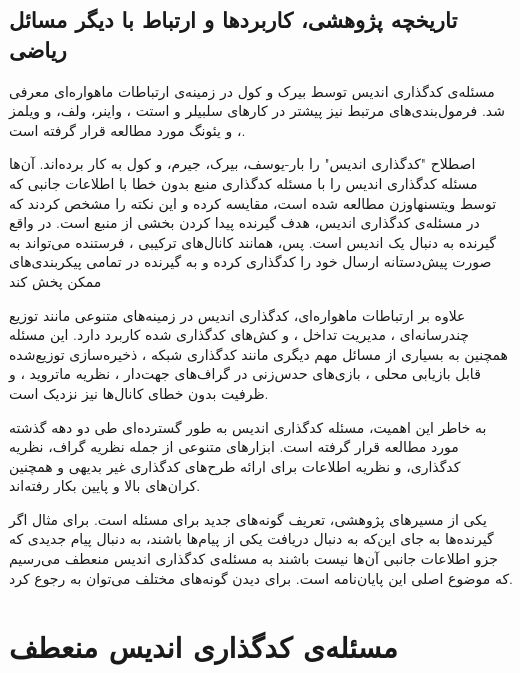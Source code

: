\subsection{تاریخچه پژوهشی، کاربردها و ارتباط با دیگر مسائل ریاضی}

مسئله‌ی کدگذاری اندیس توسط بیرک و کول 
\cite{25, 26}
 در زمینه‌ی ارتباطات ماهواره‌ای معرفی شد. فرمول‌بندی‌های مرتبط نیز پیشتر در کارهای سلبیلر و استت
  \cite{paper:1455117:Celebiler}،
   واینر، ولف، و ویلمز 
\cite{152}،
و یئونگ 
\cite{158}
 مورد مطالعه قرار گرفته است.
 
 \noindent
  اصطلاح "کدگذاری اندیس" را بار-یوسف، بیرک، جیرم، و کول 
\cite{4031356}
 به کار برده‌اند. آن‌ها مسئله کدگذاری اندیس را با مسئله کدگذاری منبع بدون خطا با اطلاعات جانبی که توسط ویتسنهاوزن
\cite{1055607}
 مطالعه شده است، مقایسه کرده و این نکته را مشخص کردند که در مسئله‌ی کدگذاری اندیس، هدف گیرنده پیدا کردن بخشی از منبع است. در واقع گیرنده به دنبال یک اندیس است. پس، همانند کانال‌های ترکیبی
 \cite{27, 53, 154}،
 فرستنده می‌تواند به صورت پیش‌دستانه ارسال خود را کدگذاری کرده و به گیرنده در تمامی پیکربندی‌های ممکن پخش کند
\cite{48}

 علاوه بر ارتباطات ماهواره‌ای، کدگذاری اندیس در زمینه‌های متنوعی مانند توزیع چندرسانه‌ای 
\cite{114}،
مدیریت تداخل 
\cite{81}،
و کش‌های کدگذاری شده 
\cite{103, 82}
 کاربرد دارد. این مسئله همچنین به بسیاری از مسائل مهم دیگری مانند کدگذاری شبکه 
\cite{122, 61, 59}،
ذخیره‌سازی توزیع‌شده قابل بازیابی محلی 
\cite{108, 128, 13}،
بازی‌های حدس‌زنی در گراف‌های جهت‌دار 
\cite{122, 162, 13}،
نظریه ماتروید 
\cite{61}،
و ظرفیت بدون خطای کانال‌ها 
\cite{131}
 نیز نزدیک است.
 
به خاطر این اهمیت، مسئله کدگذاری اندیس به طور گسترده‌ای طی دو دهه گذشته مورد مطالعه قرار گرفته است. ابزارهای متنوعی از جمله نظریه گراف، نظریه کدگذاری، و نظریه اطلاعات برای ارائه طرح‌های کدگذاری غیر بدیهی
\cite{25, 101, 22, 43, 114, 29, 8, 104, 81, 130, 7, 9, 149, 116, 80, 141, 146, 162}
و همچنین کران‌‌های بالا و پایین 
\cite{160, 22, 55, 28, 17, 141}
 بکار رفته‌اند.
 
 یکی از مسیرهای پژوهشی، تعریف گونه‌های جدید برای مسئله است. برای مثال اگر گیرنده‌ها به جای این‌که به دنبال دریافت یکی از پیام‌ها باشند، به دنبال پیام جدیدی که جزو اطلاعات جانبی آن‌ها نیست باشند به مسئله‌ی کدگذاری اندیس منعطف می‌رسیم که موضوع اصلی این پایان‌نامه است. برای دیدن گونه‌های مختلف می‌توان به
 \cite{pliablefirstpaper, verypliable, byrne2023preferential}
 رجوع کرد.
 \pagebreak
 \section{مسئله‌ی کدگذاری اندیس منعطف}
 
